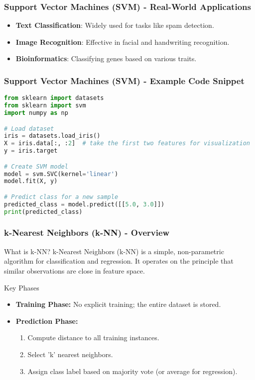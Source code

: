 \documentclass[aspectratio=169]{beamer}
\begin{document}
\begin{frame}
    \frametitle{Support Vector Machines (SVM) - Real-World Applications}
    \begin{itemize}
        \item \textbf{Text Classification}: Widely used for tasks like spam detection.
        \item \textbf{Image Recognition}: Effective in facial and handwriting recognition.
        \item \textbf{Bioinformatics}: Classifying genes based on various traits.
    \end{itemize}
\end{frame}

\begin{frame}[fragile]
    \frametitle{Support Vector Machines (SVM) - Example Code Snippet}
    \begin{lstlisting}[language=Python]
from sklearn import datasets
from sklearn import svm
import numpy as np

# Load dataset
iris = datasets.load_iris()
X = iris.data[:, :2]  # take the first two features for visualization
y = iris.target

# Create SVM model
model = svm.SVC(kernel='linear')
model.fit(X, y)

# Predict class for a new sample
predicted_class = model.predict([[5.0, 3.0]])
print(predicted_class)
    \end{lstlisting}
\end{frame}

\begin{frame}[fragile]
    \frametitle{k-Nearest Neighbors (k-NN) - Overview}
    \begin{block}{What is k-NN?}
        k-Nearest Neighbors (k-NN) is a simple, non-parametric algorithm for classification and regression.
        It operates on the principle that similar observations are close in feature space.
    \end{block}
    
    \begin{block}{Key Phases}
        \begin{itemize}
            \item \textbf{Training Phase:} No explicit training; the entire dataset is stored.
            \item \textbf{Prediction Phase:} 
                \begin{enumerate}
                    \item Compute distance to all training instances.
                    \item Select 'k' nearest neighbors.
                    \item Assign class label based on majority vote (or average for regression).
                \end{enumerate}
        \end{itemize}
    \end{block}
\end{frame}
\end{document}
